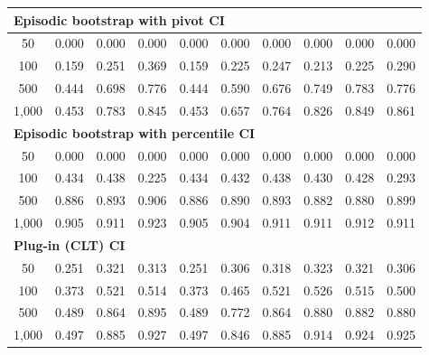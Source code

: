\documentclass{article}
\numberwithin{equation}{section}
\begin{document}
\begin{table}[ht]
\begin{tabular}{c|ccc|cccccc}
\hline
\multicolumn{10}{l}{\textbf{Episodic bootstrap with pivot CI}} \\ \hline
50
& 0.000 & 0.000 & 0.000
& 0.000 & 0.000 & 0.000 & 0.000 & 0.000 & 0.000 \\
100
& 0.159 & 0.251 & 0.369
& 0.159 & 0.225 & 0.247 & 0.213 & 0.225 & 0.290 \\
500
& 0.444 & 0.698 & \cellcolor{covheat!13!white}0.776
& 0.444 & 0.590 & 0.676 & 0.749 & \cellcolor{covheat!17!white}0.783 & \cellcolor{covheat!13!white}0.776 \\
1{,}000
& 0.453 & \cellcolor{covheat!17!white}0.783 & \cellcolor{covheat!48!white}0.845
& 0.453 & 0.657 & \cellcolor{covheat!7!white}0.764 & \cellcolor{covheat!38!white}0.826 & \cellcolor{covheat!50!white}0.849 & \cellcolor{covheat!56!white}0.861 \\
\hline
\multicolumn{10}{l}{\textbf{Episodic bootstrap with percentile CI}} \\ \hline
50
& 0.000 & 0.000 & 0.000
& 0.000 & 0.000 & 0.000 & 0.000 & 0.000 & 0.000 \\
100
& 0.434 & 0.438 & 0.225
& 0.434 & 0.432 & 0.438 & 0.430 & 0.428 & 0.293 \\
500
& \cellcolor{covheat!68!white}0.886 & \cellcolor{covheat!72!white}0.893 & \cellcolor{covheat!78!white}0.906
& \cellcolor{covheat!68!white}0.886 & \cellcolor{covheat!70!white}0.890 & \cellcolor{covheat!72!white}0.893 & \cellcolor{covheat!66!white}0.882 & \cellcolor{covheat!65!white}0.880 & \cellcolor{covheat!75!white}0.899 \\
1{,}000
& \cellcolor{covheat!78!white}0.905 & \cellcolor{covheat!81!white}0.911 & \cellcolor{covheat!87!white}0.923
& \cellcolor{covheat!78!white}0.905 & \cellcolor{covheat!77!white}0.904 & \cellcolor{covheat!81!white}0.911 & \cellcolor{covheat!81!white}0.911 & \cellcolor{covheat!81!white}0.912 & \cellcolor{covheat!81!white}0.911 \\
\hline
\multicolumn{10}{l}{\textbf{Plug-in (CLT) CI}} \\ \hline
50
& 0.251 & 0.321 & 0.313
& 0.251 & 0.306 & 0.318 & 0.323 & 0.321 & 0.306 \\
100
& 0.373 & 0.521 & 0.514
& 0.373 & 0.465 & 0.521 & 0.526 & 0.515 & 0.500 \\
500
& 0.489 & \cellcolor{covheat!57!white}0.864 & \cellcolor{covheat!73!white}0.895
& 0.489 & \cellcolor{covheat!11!white}0.772 & \cellcolor{covheat!57!white}0.864 & \cellcolor{covheat!65!white}0.880 & \cellcolor{covheat!66!white}0.882 & \cellcolor{covheat!65!white}0.880  \\
1{,}000
& 0.497 & \cellcolor{covheat!68!white}0.885 & \cellcolor{covheat!89!white}0.927
& 0.497 & \cellcolor{covheat!48!white}0.846 & \cellcolor{covheat!68!white}0.885 & \cellcolor{covheat!82!white}0.914 & \cellcolor{covheat!87!white}0.924 & \cellcolor{covheat!88!white}0.925 \\
\hline
\end{tabular}
\end{table}
\end{document}
